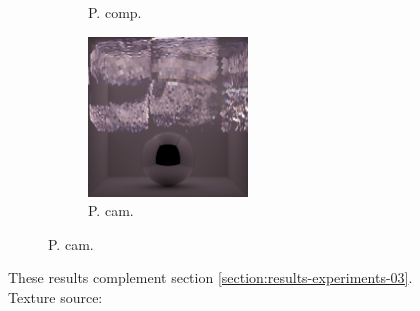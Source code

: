 \begin{figure}[]
\begin{subfigure}{\textwidth}
\begin{subfigure}{0.19\textwidth}
            \caption*{P. comp.}
        \end{subfigure}
        \hfill
        \begin{subfigure}{0.19\textwidth}
            \centering
            \includegraphics[width=\textwidth]{images/04-experiment03/ball/beams/pixel_proj.jpg}
            \caption*{P. cam.}
        \end{subfigure}
    \end{subfigure}
    \caption{These results complement section \ref{section:results-experiments-03}. Texture source: \citet{Pixar128}}
    \label{fig:ex03-complete-ball}
\end{figure}

